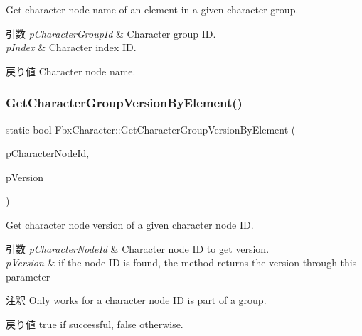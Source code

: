 Get character node name of an element in a given character group. 
\begin{DoxyParams}{引数}
{\em p\+Character\+Group\+Id} & Character group ID. \\
\hline
{\em p\+Index} & Character index ID. \\
\hline
\end{DoxyParams}
\begin{DoxyReturn}{戻り値}
Character node name. 
\end{DoxyReturn}
\mbox{\label{class_fbx_character_adca146a3155027af9ea82513fa614ef1}} 
\subsubsection{\texorpdfstring{Get\+Character\+Group\+Version\+By\+Element()}{GetCharacterGroupVersionByElement()}}
{\footnotesize\ttfamily static bool Fbx\+Character\+::\+Get\+Character\+Group\+Version\+By\+Element (\begin{DoxyParamCaption}\item[{\hyperlink{class_fbx_character_ad75bf42026e435ac0ff4d7ece2317be4}{E\+Node\+Id}}]{p\+Character\+Node\+Id,  }\item[{int \&}]{p\+Version }\end{DoxyParamCaption})\hspace{0.3cm}{\ttfamily [static]}}

Get character node version of a given character node ID. 
\begin{DoxyParams}{引数}
{\em p\+Character\+Node\+Id} & Character node ID to get version. \\
\hline
{\em p\+Version} & if the node ID is found, the method returns the version through this parameter \\
\hline
\end{DoxyParams}
\begin{DoxyRemark}{注釈}
Only works for a character node ID is part of a group. 
\end{DoxyRemark}
\begin{DoxyReturn}{戻り値}
{\ttfamily true} if successful, {\ttfamily false} otherwise. 
\end{DoxyReturn}
\mbox{\label{class_fbx_character_a1881005b51b372f7b9238da7fdcf5367}} 
